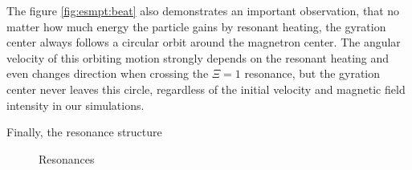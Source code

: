 The figure \ref{fig:esmpt:beat} also demonstrates an important
observation, that no matter how much energy the particle
gains by resonant heating, the gyration center always follows
a circular orbit around the magnetron center. The angular
velocity of this
orbiting motion strongly depends on the resonant heating
and even changes direction when crossing the $\Xi=1$ resonance,
but the gyration center never leaves this circle, regardless of
the initial velocity and magnetic field intensity in our simulations.

Finally, the resonance structure
\begin{figure}
\caption{
Resonances
}
\label{fig:esmpt:resonances}
\end{figure}
